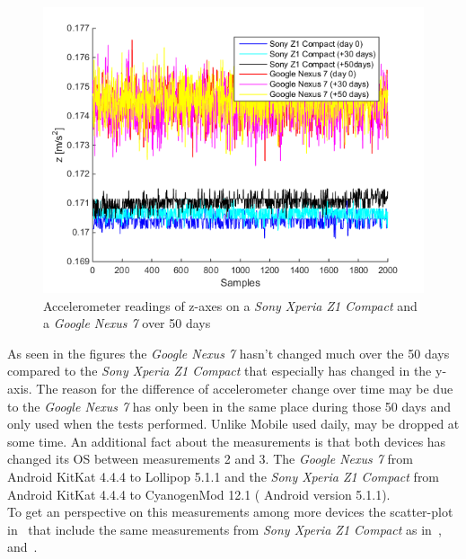 \begin{figure}[H]
	\centering
	\includegraphics[scale=.7]{img/sensrec-nex-z1-acc-z}
	\caption{Accelerometer readings of z-axes on a  \textit{Sony Xperia Z1 Compact} and a \textit{Google Nexus 7} over 50 days}
	\label{fig:z50days}
\end{figure}
As seen in the figures the \textit{Google Nexus 7} hasn't changed much over the 50 days compared to the \textit{Sony Xperia Z1 Compact} that especially has changed in the y-axis. The reason for the difference of accelerometer change over time may be due to the \textit{Google Nexus 7} has only been in the same place during those 50 days and only used when the tests performed. Unlike Mobile used daily, may be dropped at some time. An additional fact about the measurements is that both devices has changed its OS between measurements 2 and 3. The \textit{Google Nexus 7} from Android KitKat 4.4.4 to Lollipop 5.1.1 and the \textit{Sony Xperia Z1 Compact} from Android KitKat 4.4.4 to CyanogenMod 12.1 ( Android version 5.1.1). \\
To get an perspective on this measurements among more devices the scatter-plot in~ that include the same measurements from \textit{Sony Xperia Z1 Compact} as in~,~ and~.
